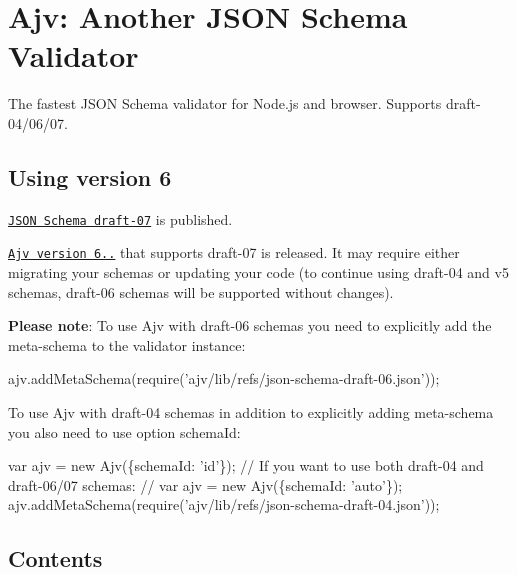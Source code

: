 

\section*{Ajv\+: Another J\+S\+ON Schema Validator}

The fastest J\+S\+ON Schema validator for Node.\+js and browser. Supports draft-\/04/06/07.

\href{https://travis-ci.org/epoberezkin/ajv}{\tt } \href{https://www.npmjs.com/package/ajv}{\tt } \href{https://www.npmjs.com/package/ajv}{\tt } \href{https://coveralls.io/github/epoberezkin/ajv?branch=master}{\tt } \href{https://greenkeeper.io/}{\tt } \href{https://gitter.im/ajv-validator/ajv}{\tt }

\subsection*{Using version 6}

\href{http://json-schema.org/latest/json-schema-validation.html}{\tt J\+S\+ON Schema draft-\/07} is published.

\href{https://github.com/epoberezkin/ajv/releases/tag/v6.0.0}{\tt Ajv version 6..} that supports draft-\/07 is released. It may require either migrating your schemas or updating your code (to continue using draft-\/04 and v5 schemas, draft-\/06 schemas will be supported without changes).

{\bfseries Please note}\+: To use Ajv with draft-\/06 schemas you need to explicitly add the meta-\/schema to the validator instance\+:


\begin{DoxyCode}
ajv.addMetaSchema(require('ajv/lib/refs/json-schema-draft-06.json'));
\end{DoxyCode}


To use Ajv with draft-\/04 schemas in addition to explicitly adding meta-\/schema you also need to use option schema\+Id\+:


\begin{DoxyCode}
var ajv = new Ajv(\{schemaId: 'id'\});
// If you want to use both draft-04 and draft-06/07 schemas:
// var ajv = new Ajv(\{schemaId: 'auto'\});
ajv.addMetaSchema(require('ajv/lib/refs/json-schema-draft-04.json'));
\end{DoxyCode}


\subsection*{Contents}


